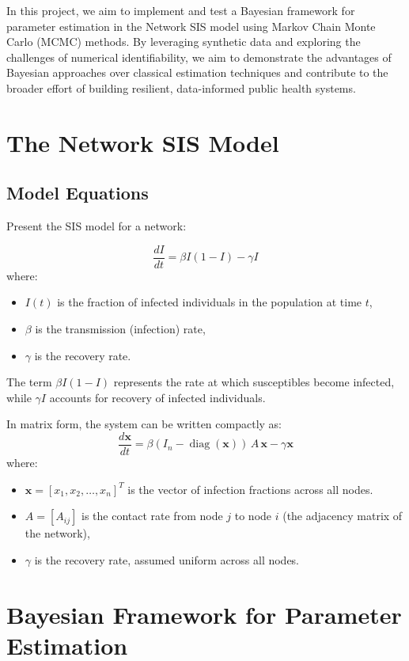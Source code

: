 \documentclass[a4paper,10pt]{report}
\begin{document}
In this project, we aim to implement and test a Bayesian framework for parameter estimation in the Network SIS model using Markov Chain Monte Carlo (MCMC) methods. By leveraging synthetic data and exploring the challenges of numerical identifiability, we aim to demonstrate the advantages of Bayesian approaches over classical estimation techniques and contribute to the broader effort of building resilient, data-informed public health systems.


\section{The Network SIS Model}
\subsection{Model Equations}
Present the SIS model for a network:

\[
\boxed{
\frac{dI}{dt} = \beta I (1 - I) - \gamma I
}
\]
where:
\begin{itemize}
    \item $I(t)$ is the fraction of infected individuals in the population at time $t$,
    \item $\beta$ is the transmission (infection) rate,
    \item $\gamma$ is the recovery rate.
\end{itemize}

The term $\beta I (1 - I)$ represents the rate at which susceptibles become infected, while $\gamma I$ accounts for recovery of infected individuals.



In matrix form, the system can be written compactly as:
\[
\boxed{
\frac{d\mathbf{x}}{dt} = \beta (I_n-\operatorname{diag}(\mathbf{x})) \, A \, \mathbf{x} - \gamma \mathbf{x}
}
\]
where: 
\begin{itemize}
    \item $\mathbf{x} = [x_1, x_2, \dots, x_n]^T$ is the vector of infection fractions across all nodes.
    \item $A = [A_{ij}]$ is the contact rate from node $j$ to node $i$ (the adjacency matrix of the network),
    \item $\gamma$ is the recovery rate, assumed uniform across all nodes.
\end{itemize}


\section{Bayesian Framework for Parameter Estimation}
\end{document}
